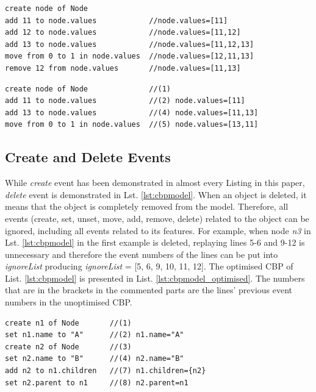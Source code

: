 \documentclass{llncs}
\begin{document}
\begin{lstlisting}[style=eol,caption={The CBP representation of attribute \emph{values}'s move event.},label=lst:move_attribute_example]
create node of Node
add 11 to node.values            //node.values=[11] 
add 12 to node.values            //node.values=[11,12] 
add 13 to node.values            //node.values=[11,12,13] 
move from 0 to 1 in node.values  //node.values=[12,11,13]  
remove 12 from node.values       //node.values=[11,13] 
\end{lstlisting}

\begin{lstlisting}[style=eol,caption={The optimised CBP representation of attribute \emph{values}'s event.},label=lst:move_attribute_example_error]
create node of Node              //(1)  
add 11 to node.values            //(2) node.values=[11] 
add 13 to node.values            //(4) node.values=[11,13] 
move from 0 to 1 in node.values  //(5) node.values=[13,11]   
\end{lstlisting}

\subsection{Create and Delete Events}
\label{subsec:create_and_delete_operations}
While \emph{create} event has been demonstrated in almost every Listing in this paper, \emph{delete} event is demonstrated in Lst. \ref{lst:cbpmodel}. When an object is deleted, it means that the object is completely removed from the model. Therefore, all events (create, set, unset, move, add, remove, delete) related to the object can be ignored, including all events related to its features. For example, when node \emph{n3} in Lst. \ref{lst:cbpmodel}  in the first example is deleted, replaying lines 5-6 and 9-12 is unnecessary and therefore the event numbers of the lines can be put into \emph{ignoreList} producing \emph{ignoreList} = [5, 6, 9, 10, 11, 12]. The optimised CBP of List. \ref{lst:cbpmodel} is presented in List. \ref{lst:cbpmodel_optimised}. The numbers that are in the brackets in the commented parts are the lines' previous event numbers in the unoptimised CBP.  

\begin{lstlisting}[style=eol,caption={Change-based representation of the model of Figure \ref{fig:initial_model} after removal of node \emph{n5}.},label=lst:cbpmodel_optimised]
create n1 of Node       //(1)
set n1.name to "A"      //(2) n1.name="A"
create n2 of Node       //(3)
set n2.name to "B"      //(4) n2.name="B"
add n2 to n1.children   //(7) n1.children={n2}
set n2.parent to n1     //(8) n2.parent=n1
\end{lstlisting}
\end{document}
